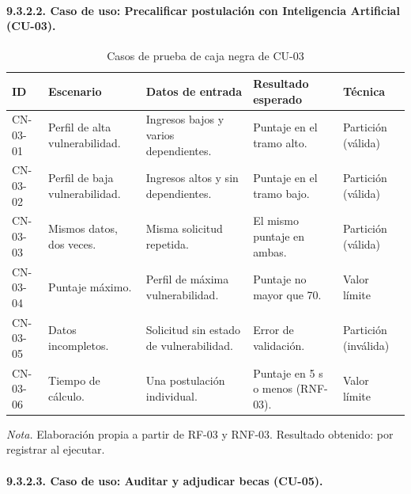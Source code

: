 \paragraph{9.3.2.2. Caso de uso: Precalificar postulación con Inteligencia Artificial (CU-03).}

\begin{table}[H]
\centering
\caption{Casos de prueba de caja negra de CU-03}
\label{tab:cn_cu03}
\small
\begin{tabular}{@{}p{1.1cm}p{3.7cm}p{4.0cm}p{3.1cm}p{1.8cm}@{}}
\toprule
\textbf{ID} & \textbf{Escenario} & \textbf{Datos de entrada} & \textbf{Resultado esperado} & \textbf{Técnica} \\
\midrule
CN-03-01 & Perfil de alta vulnerabilidad. & Ingresos bajos y varios dependientes. & Puntaje en el tramo alto. & Partición (válida) \\
CN-03-02 & Perfil de baja vulnerabilidad. & Ingresos altos y sin dependientes. & Puntaje en el tramo bajo. & Partición (válida) \\
CN-03-03 & Mismos datos, dos veces. & Misma solicitud repetida. & El mismo puntaje en ambas. & Partición (válida) \\
CN-03-04 & Puntaje máximo. & Perfil de máxima vulnerabilidad. & Puntaje no mayor que 70. & Valor límite \\
CN-03-05 & Datos incompletos. & Solicitud sin estado de vulnerabilidad. & Error de validación. & Partición (inválida) \\
CN-03-06 & Tiempo de cálculo. & Una postulación individual. & Puntaje en 5 s o menos (RNF-03). & Valor límite \\
\bottomrule
\end{tabular}

\vspace{2pt}
\footnotesize\textit{Nota.} Elaboración propia a partir de RF-03 y RNF-03. Resultado obtenido: por registrar al ejecutar.
\end{table}

\paragraph{9.3.2.3. Caso de uso: Auditar y adjudicar becas (CU-05).}

